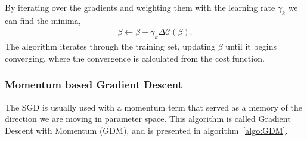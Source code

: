 \documentclass[english,notitlepage,reprint,nofootinbib]{revtex4-2}  %
\begin{document}

By iterating over the gradients and weighting them with the learning rate $\gamma_k$ we can find the minima, 
\begin{align}
    \beta \leftarrow \beta - \gamma_k \Delta \mathcal{C}(\beta). 
\end{align}
The algorithm iterates through the training set, updating $\beta$ until it begins converging, where the convergence is calculated from the cost function. 

\subsubsection*{Momentum based Gradient Descent}%
The SGD is usually used with a momentum term that served as a memory of the direction we are moving in parameter space. This algorithm is called Gradient Descent with Momentum (GDM), and is presented in algorithm~\ref{algo:GDM}. 
\end{document}
